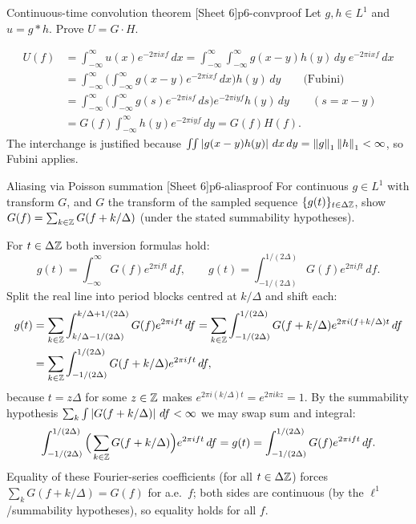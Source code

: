 \begin{exercise}{Continuous-time convolution theorem \quad\textnormal{[Sheet 6]}}{p6-convproof}
Let $g,h\in L^1$ and $u=g*h$. Prove $U=G\cdot H$.
\end{exercise}
\begin{solution}
\[
\begin{aligned}
U(f)&=\int_{-\infty}^{\infty} u(x)e^{-2\pi i x f}\,dx
     =\int_{-\infty}^{\infty}\!\!\int_{-\infty}^{\infty} g(x-y)h(y)\,dy\;e^{-2\pi i x f}\,dx\\
    &=\int_{-\infty}^{\infty}\Big(\int_{-\infty}^{\infty} g(x-y)e^{-2\pi i x f}\,dx\Big)h(y)\,dy
     \qquad\text{(Fubini)}\\
    &=\int_{-\infty}^{\infty}\Big(\int_{-\infty}^{\infty} g(s)e^{-2\pi i s f}\,ds\Big)
       e^{-2\pi i y f}h(y)\,dy
     \qquad (s=x-y)\\
    &=G(f)\int_{-\infty}^{\infty} h(y)e^{-2\pi i y f}\,dy=G(f)H(f).
\end{aligned}
\]
The interchange is justified because
$\iint\left\lvert g(x-y)h(y) \right\rvert\,dx\,dy=\left\lVert g \right\rVert_1\left\lVert h \right\rVert_1<\infty$, so Fubini applies.
\end{solution}

\begin{exercise}{Aliasing via Poisson summation \quad\textnormal{[Sheet 6]}}{p6-aliasproof}
For continuous $g\in L^1$ with transform $G$, and $G$ the transform of the
sampled sequence $\{g(t)\}_{t\in\Delta\mathbb{Z}}$, show
$G(f)=\sum_{k\in\mathbb{Z}} G(f+k/\Delta)$ (under the stated summability
hypotheses).
\end{exercise}
\begin{solution}
For $t\in\Delta\mathbb{Z}$ both inversion formulas hold:
\[
g(t)=\int_{-\infty}^{\infty} G(f)e^{2\pi i f t}\,df,
\qquad
g(t)=\int_{-1/(2\Delta)}^{1/(2\Delta)} G(f)e^{2\pi i f t}\,df .
\]
Split the real line into period blocks centred at $k/\Delta$ and shift each:
\[
\begin{aligned}
g(t)&=\sum_{k\in\mathbb{Z}}\int_{k/\Delta-1/(2\Delta)}^{k/\Delta+1/(2\Delta)} G(f)e^{2\pi i f t}\,df
     =\sum_{k\in\mathbb{Z}}\int_{-1/(2\Delta)}^{1/(2\Delta)} G(f+k/\Delta)e^{2\pi i (f+k/\Delta)t}\,df\\
    &=\sum_{k\in\mathbb{Z}}\int_{-1/(2\Delta)}^{1/(2\Delta)} G(f+k/\Delta)e^{2\pi i f t}\,df,
\end{aligned}
\]
because $t=z\Delta$ for some $z\in\mathbb{Z}$ makes $e^{2\pi i (k/\Delta)t}
=e^{2\pi i kz}=1$. By the summability hypothesis
$\sum_k\int\left\lvert G(f+k/\Delta) \right\rvert\,df<\infty$ we may swap sum and integral:
\[
\int_{-1/(2\Delta)}^{1/(2\Delta)}\Big(\sum_{k\in\mathbb{Z}} G(f+k/\Delta)\Big)e^{2\pi i f t}\,df
=g(t)=\int_{-1/(2\Delta)}^{1/(2\Delta)} G(f)e^{2\pi i f t}\,df .
\]
Equality of these Fourier-series coefficients (for all $t\in\Delta\mathbb{Z}$) forces
$\sum_k G(f+k/\Delta)=G(f)$ for a.e.\ $f$; both sides are continuous (by the
$\ell^1$/summability hypotheses), so equality holds for all $f$.
\end{solution}

